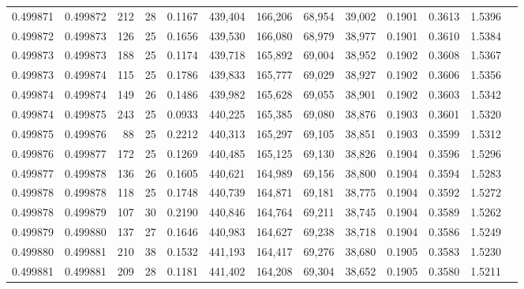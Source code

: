 \begin{tabular}{rrrrrrrrrrrrr}
0.499871 & 0.499872 & 212 &  28 &                                     0.1167 & 439,404 & 166,206 &  68,954 &  39,002 & 0.1901 & 0.3613 & 1.5396 \\
0.499872 & 0.499873 & 126 &  25 &                                     0.1656 & 439,530 & 166,080 &  68,979 &  38,977 & 0.1901 & 0.3610 & 1.5384 \\
0.499873 & 0.499873 & 188 &  25 &                                     0.1174 & 439,718 & 165,892 &  69,004 &  38,952 & 0.1902 & 0.3608 & 1.5367 \\
0.499873 & 0.499874 & 115 &  25 &                                     0.1786 & 439,833 & 165,777 &  69,029 &  38,927 & 0.1902 & 0.3606 & 1.5356 \\
0.499874 & 0.499874 & 149 &  26 &                                     0.1486 & 439,982 & 165,628 &  69,055 &  38,901 & 0.1902 & 0.3603 & 1.5342 \\
0.499874 & 0.499875 & 243 &  25 &                                     0.0933 & 440,225 & 165,385 &  69,080 &  38,876 & 0.1903 & 0.3601 & 1.5320 \\
0.499875 & 0.499876 &  88 &  25 &                                     0.2212 & 440,313 & 165,297 &  69,105 &  38,851 & 0.1903 & 0.3599 & 1.5312 \\
0.499876 & 0.499877 & 172 &  25 &                                     0.1269 & 440,485 & 165,125 &  69,130 &  38,826 & 0.1904 & 0.3596 & 1.5296 \\
0.499877 & 0.499878 & 136 &  26 &                                     0.1605 & 440,621 & 164,989 &  69,156 &  38,800 & 0.1904 & 0.3594 & 1.5283 \\
0.499878 & 0.499878 & 118 &  25 &                                     0.1748 & 440,739 & 164,871 &  69,181 &  38,775 & 0.1904 & 0.3592 & 1.5272 \\
0.499878 & 0.499879 & 107 &  30 &                                     0.2190 & 440,846 & 164,764 &  69,211 &  38,745 & 0.1904 & 0.3589 & 1.5262 \\
0.499879 & 0.499880 & 137 &  27 &                                     0.1646 & 440,983 & 164,627 &  69,238 &  38,718 & 0.1904 & 0.3586 & 1.5249 \\
0.499880 & 0.499881 & 210 &  38 &                                     0.1532 & 441,193 & 164,417 &  69,276 &  38,680 & 0.1905 & 0.3583 & 1.5230 \\
0.499881 & 0.499881 & 209 &  28 &                                     0.1181 & 441,402 & 164,208 &  69,304 &  38,652 & 0.1905 & 0.3580 & 1.5211 \\

\end{tabular}

